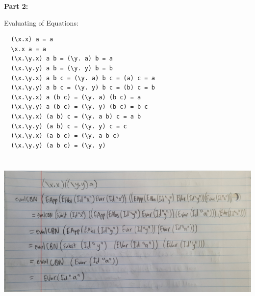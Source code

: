 \documentclass{article}
\theoremstyle{theorem}
\theoremstyle{definition}
\theoremstyle{remark}
\begin{document}
\textbf{Part 2:}

Evaluating of Equations:
\begin{lstlisting}
  (\x.x) a = a
  \x.x a = a
  (\x.\y.x) a b = (\y. a) b = a
  (\x.\y.y) a b = (\y. y) b = b
  (\x.\y.x) a b c = (\y. a) b c = (a) c = a
  (\x.\y.y) a b c = (\y. y) b c = (b) c = b
  (\x.\y.x) a (b c) = (\y. a) (b c) = a
  (\x.\y.y) a (b c) = (\y. y) (b c) = b c
  (\x.\y.x) (a b) c = (\y. a b) c = a b
  (\x.\y.y) (a b) c = (\y. y) c = c
  (\x.\y.x) (a b c) = (\y. a b c)
  (\x.\y.y) (a b c) = (\y. y)
\end{lstlisting}

\includegraphics[width=15cm, height=8cm]{Report Images/week5_9.jpg}
\end{document}

